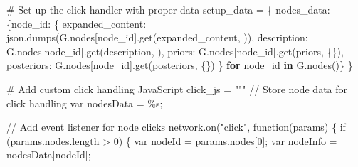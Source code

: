 \documentclass[
  11pt,
  letterpaper,
]{book}
\newenvironment{Shaded}{\begin{snugshade}}{\end{snugshade}}
\newcommand{\CommentTok}[1]{\textcolor[rgb]{0.37,0.37,0.37}{#1}}
\newcommand{\ControlFlowTok}[1]{\textcolor[rgb]{0.00,0.23,0.31}{\textbf{#1}}}
\newcommand{\KeywordTok}[1]{\textcolor[rgb]{0.00,0.23,0.31}{\textbf{#1}}}
\newcommand{\NormalTok}[1]{\textcolor[rgb]{0.00,0.23,0.31}{#1}}
\newcommand{\OperatorTok}[1]{\textcolor[rgb]{0.37,0.37,0.37}{#1}}
\newcommand{\SpecialCharTok}[1]{\textcolor[rgb]{0.37,0.37,0.37}{#1}}
\newcommand{\StringTok}[1]{\textcolor[rgb]{0.13,0.47,0.30}{#1}}
\begin{document}
\begin{Shaded}
\begin{Highlighting}[]
    \CommentTok{\# Set up the click handler with proper data}
\NormalTok{    setup\_data }\OperatorTok{=}\NormalTok{ \{}
        \StringTok{\textquotesingle{}nodes\_data\textquotesingle{}}\NormalTok{: \{node\_id: \{}
            \StringTok{\textquotesingle{}expanded\_content\textquotesingle{}}\NormalTok{: json.dumps(G.nodes[node\_id].get(}\StringTok{\textquotesingle{}expanded\_content\textquotesingle{}}\NormalTok{, }\StringTok{\textquotesingle{}\textquotesingle{}}\NormalTok{)),}
            \StringTok{\textquotesingle{}description\textquotesingle{}}\NormalTok{: G.nodes[node\_id].get(}\StringTok{\textquotesingle{}description\textquotesingle{}}\NormalTok{, }\StringTok{\textquotesingle{}\textquotesingle{}}\NormalTok{),}
            \StringTok{\textquotesingle{}priors\textquotesingle{}}\NormalTok{: G.nodes[node\_id].get(}\StringTok{\textquotesingle{}priors\textquotesingle{}}\NormalTok{, \{\}),}
            \StringTok{\textquotesingle{}posteriors\textquotesingle{}}\NormalTok{: G.nodes[node\_id].get(}\StringTok{\textquotesingle{}posteriors\textquotesingle{}}\NormalTok{, \{\})}
\NormalTok{        \} }\ControlFlowTok{for}\NormalTok{ node\_id }\KeywordTok{in}\NormalTok{ G.nodes()\}}
\NormalTok{    \}}

    \CommentTok{\# Add custom click handling JavaScript}
\NormalTok{    click\_js }\OperatorTok{=} \StringTok{"""}
\StringTok{    // Store node data for click handling}
\StringTok{    var nodesData = }\SpecialCharTok{\%s}\StringTok{;}

\StringTok{    // Add event listener for node clicks}
\StringTok{    network.on("click", function(params) \{}
\StringTok{        if (params.nodes.length \textgreater{} 0) \{}
\StringTok{            var nodeId = params.nodes[0];}
\StringTok{            var nodeInfo = nodesData[nodeId];}


\end{Highlighting}
\end{Shaded}
\end{document}
